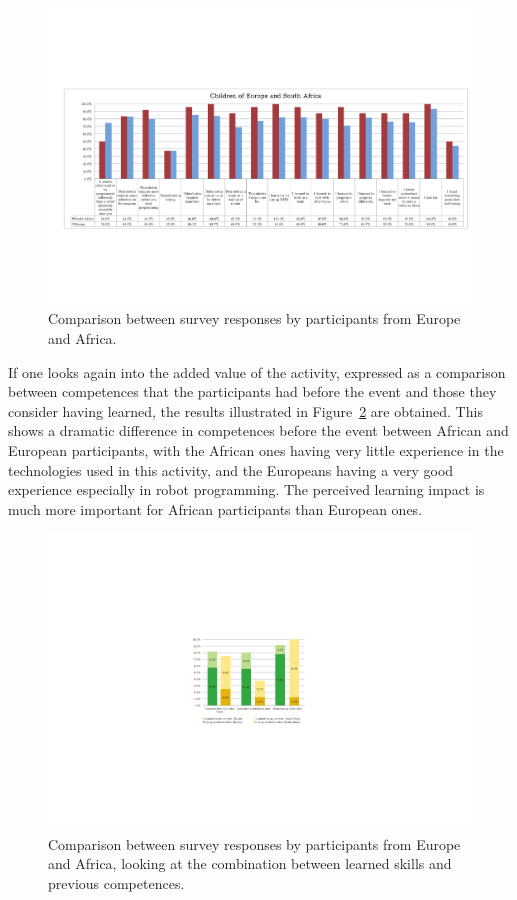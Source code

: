 \documentclass{intech-journal}
\begin{document}
\begin{figure}[ht]
 \centering
    \includegraphics[width=\columnwidth]{figures/all-eu-sa.pdf}
  \caption{Comparison between survey responses by participants from Europe and Africa.}
  \label{fig:EU-SA} 
\end{figure}

If one looks again into the added value of the activity, expressed as a comparison between competences that the participants had before the event and those they consider having learned, the results illustrated in Figure~\ref{fig:EU-SA-learn} are obtained.
This shows a dramatic difference in competences before the event between African and European participants, with the African ones having very little experience in the technologies used in this activity, and the Europeans having a very good experience especially in robot programming. 
The perceived learning impact is much more important for African participants than European ones. 

\begin{figure}[ht]
 \centering
    \includegraphics[width=0.6\columnwidth]{figures/EU-SA-learned.pdf}
  \caption{Comparison between survey responses by participants from Europe and Africa, looking at the combination between learned skills and previous competences.}
  \label{fig:EU-SA-learn} 
\end{figure}
\end{document}
